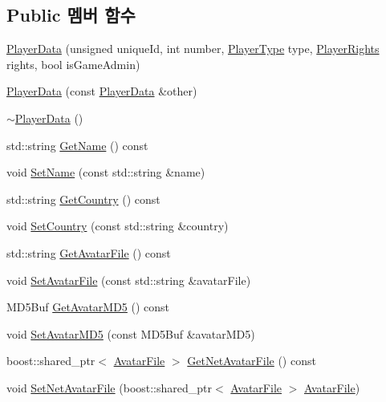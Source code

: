 \subsection*{Public 멤버 함수}
\begin{DoxyCompactItemize}
\item 
\hyperlink{class_player_data_afd58f88036497dea0cd37e01fe14de5b}{Player\-Data} (unsigned unique\-Id, int number, \hyperlink{playerdata_8h_abe590f3c9109f404f003d5d7e4f0fccf}{Player\-Type} type, \hyperlink{playerdata_8h_ac0c72aca5c5ceabb2abbcd2d2c02aba6}{Player\-Rights} rights, bool is\-Game\-Admin)
\item 
\hyperlink{class_player_data_a7d58f6cfbdbdc4e9066772dc57e5c9dc}{Player\-Data} (const \hyperlink{class_player_data}{Player\-Data} \&other)
\item 
\hyperlink{class_player_data_a253ae40fb805d8ff0cf9d884ab504d8a}{$\sim$\-Player\-Data} ()
\item 
std\-::string \hyperlink{class_player_data_a9ccadf260a63a25c0a2644a9863dba45}{Get\-Name} () const 
\item 
void \hyperlink{class_player_data_a0ce3965e0a0baf505eca8e13d7580f19}{Set\-Name} (const std\-::string \&name)
\item 
std\-::string \hyperlink{class_player_data_a613727a01585bb57e61dfc88813b8e56}{Get\-Country} () const 
\item 
void \hyperlink{class_player_data_aeb99c2c6ed25af7cfd46849bef370f4f}{Set\-Country} (const std\-::string \&country)
\item 
std\-::string \hyperlink{class_player_data_a8a0cf1e986ececc7491e989e557a3383}{Get\-Avatar\-File} () const 
\item 
void \hyperlink{class_player_data_a8174f11d0740db3f312c6b13fb2fe737}{Set\-Avatar\-File} (const std\-::string \&avatar\-File)
\item 
M\-D5\-Buf \hyperlink{class_player_data_aa305d3aced0a792551cebf1ea6a3eafa}{Get\-Avatar\-M\-D5} () const 
\item 
void \hyperlink{class_player_data_a57ed0efa276e6a62add8cf6ae0f1e54f}{Set\-Avatar\-M\-D5} (const M\-D5\-Buf \&avatar\-M\-D5)
\item 
boost\-::shared\-\_\-ptr$<$ \hyperlink{struct_avatar_file}{Avatar\-File} $>$ \hyperlink{class_player_data_acbe5b0799bf0eeb1ba462bf38f3a66a8}{Get\-Net\-Avatar\-File} () const 
\item 
void \hyperlink{class_player_data_ac3d0ad92de2c8e42f7df88b40e75003d}{Set\-Net\-Avatar\-File} (boost\-::shared\-\_\-ptr$<$ \hyperlink{struct_avatar_file}{Avatar\-File} $>$ \hyperlink{struct_avatar_file}{Avatar\-File})

\end{DoxyCompactItemize}
